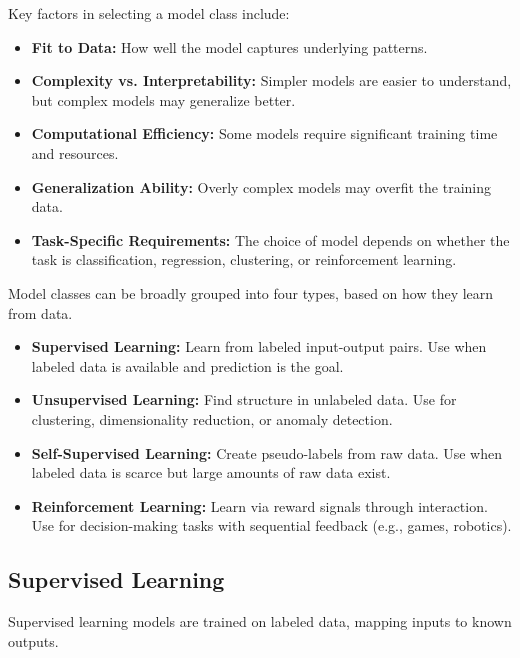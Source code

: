 \documentclass[12pt,openany]{book}
\begin{document}
Key factors in selecting a model class include:
\begin{itemize}
    \item \textbf{Fit to Data:} How well the model captures underlying patterns.
    \item \textbf{Complexity vs. Interpretability:} Simpler models are easier to understand, but complex models may generalize better.
    \item \textbf{Computational Efficiency:} Some models require significant training time and resources.
    \item \textbf{Generalization Ability:} Overly complex models may overfit the training data.
    \item \textbf{Task-Specific Requirements:} The choice of model depends on whether the task is classification, regression, clustering, or reinforcement learning.
\end{itemize}

Model classes can be broadly grouped into four types, based on how they learn from data.

\begin{itemize}
    \item \textbf{Supervised Learning:} Learn from labeled input-output pairs. Use when labeled data is available and prediction is the goal.
    \item \textbf{Unsupervised Learning:} Find structure in unlabeled data. Use for clustering, dimensionality reduction, or anomaly detection.
    \item \textbf{Self-Supervised Learning:} Create pseudo-labels from raw data. Use when labeled data is scarce but large amounts of raw data exist.
    \item \textbf{Reinforcement Learning:} Learn via reward signals through interaction. Use for decision-making tasks with sequential feedback (e.g., games, robotics).
\end{itemize}


\subsection{Supervised Learning}

Supervised learning models are trained on labeled data, mapping inputs to known outputs.
\end{document}
